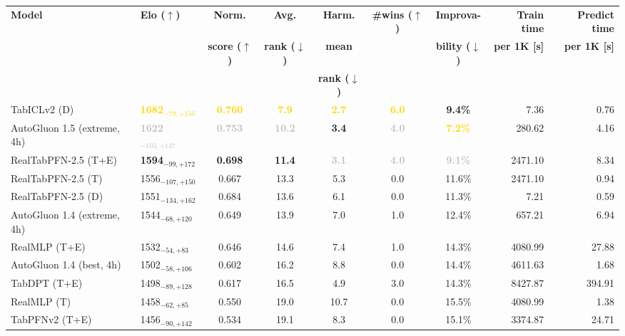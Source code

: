 \begin{tabular}{llcccccrr}
\toprule
\textbf{Model} & \textbf{Elo ($\uparrow$)} & \textbf{Norm.} & \textbf{Avg.} & \textbf{Harm.} & \textbf{\#wins ($\uparrow$)} & \textbf{Improva-} & \textbf{Train time} & \textbf{Predict time} \\
 &  & \textbf{score ($\uparrow$)} & \textbf{rank ($\downarrow$)} & \textbf{mean} &  & \textbf{bility ($\downarrow$)} & \textbf{per 1K [s]} & \textbf{per 1K [s]} \\
 &  &  &  & \textbf{rank ($\downarrow$)} &  &  &  &  \\
\midrule
TabICLv2 (D) & \textcolor{gold}{\textbf{1682${}_{-79,+150}$}} & \textcolor{gold}{\textbf{0.760}} & \textcolor{gold}{\textbf{7.9}} & \textcolor{gold}{\textbf{2.7}} & \textcolor{gold}{\textbf{6.0}} & \textcolor{bronze}{\textbf{9.4\%}} & 7.36 & 0.76 \\
AutoGluon 1.5 (extreme, 4h) & \textcolor{silver}{\textbf{1622${}_{-103,+147}$}} & \textcolor{silver}{\textbf{0.753}} & \textcolor{silver}{\textbf{10.2}} & \textcolor{bronze}{\textbf{3.4}} & \textcolor{silver}{\textbf{4.0}} & \textcolor{gold}{\textbf{7.2\%}} & 280.62 & 4.16 \\
RealTabPFN-2.5 (T+E) & \textcolor{bronze}{\textbf{1594${}_{-99,+172}$}} & \textcolor{bronze}{\textbf{0.698}} & \textcolor{bronze}{\textbf{11.4}} & \textcolor{silver}{\textbf{3.1}} & \textcolor{silver}{\textbf{4.0}} & \textcolor{silver}{\textbf{9.1\%}} & 2471.10 & 8.34 \\
RealTabPFN-2.5 (T) & 1556${}_{-107,+150}$ & 0.667 & 13.3 & 5.3 & 0.0 & 11.6\% & 2471.10 & 0.94 \\
RealTabPFN-2.5 (D) & 1551${}_{-134,+162}$ & 0.684 & 13.6 & 6.1 & 0.0 & 11.3\% & 7.21 & 0.59 \\
AutoGluon 1.4 (extreme, 4h) & 1544${}_{-68,+120}$ & 0.649 & 13.9 & 7.0 & 1.0 & 12.4\% & 657.21 & 6.94 \\
RealMLP (T+E) & 1532${}_{-54,+83}$ & 0.646 & 14.6 & 7.4 & 1.0 & 14.3\% & 4080.99 & 27.88 \\
AutoGluon 1.4 (best, 4h) & 1502${}_{-58,+106}$ & 0.602 & 16.2 & 8.8 & 0.0 & 14.4\% & 4611.63 & 1.68 \\
TabDPT (T+E) & 1498${}_{-89,+128}$ & 0.617 & 16.5 & 4.9 & 3.0 & 14.3\% & 8427.87 & 394.91 \\
RealMLP (T) & 1458${}_{-62,+85}$ & 0.550 & 19.0 & 10.7 & 0.0 & 15.5\% & 4080.99 & 1.38 \\
TabPFNv2 (T+E) & 1456${}_{-90,+142}$ & 0.534 & 19.1 & 8.3 & 0.0 & 15.1\% & 3374.87 & 24.71 \\

\end{tabular}
